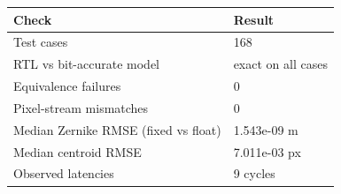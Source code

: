 \begin{tabular}{ll}
\hline
Check & Result \\
\hline
Test cases & 168 \\
RTL vs bit-accurate model & exact on all cases \\
Equivalence failures & 0 \\
Pixel-stream mismatches & 0 \\
Median Zernike RMSE (fixed vs float) & 1.543e-09 m \\
Median centroid RMSE & 7.011e-03 px \\
Observed latencies & 9 cycles \\
\hline
\end{tabular}
